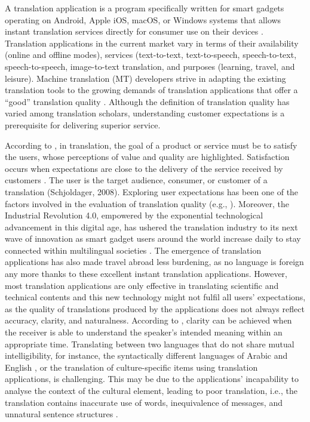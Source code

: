 \documentclass[english]{textolivre}
\begin{document}
A translation application is a program specifically written for smart gadgets operating on Android, Apple iOS, macOS, or Windows systems that allows instant translation services directly for consumer use on their devices \cite{chen_machine_2017}. Translation applications in the current market vary in terms of their availability (online and offline modes), services (text-to-text, text-to-speech, speech-to-text, speech-to-speech, image-to-text translation, and purposes (learning, travel, and leisure). Machine translation (MT) developers strive in adapting the existing translation tools to the growing demands of translation applications that offer a “good” translation quality \cite{way_quality_2018}. Although the definition of translation quality has varied among translation scholars, understanding customer expectations is a prerequisite for delivering superior service.
  
According to \textcite{kurz_conference_2002}, in translation, the goal of a product or service must be to satisfy the users, whose perceptions of value and quality are highlighted. Satisfaction occurs when expectations are close to the delivery of the service received by customers \cite{khristianto_influence_2012}. The user is the target audience, consumer, or customer of a translation (Schjoldager, 2008). Exploring user expectations has been one of the factors involved in the evaluation of translation quality (e.g., \textcite{kurz_conference_1993,tommola_estimating_2003}). Moreover, the Industrial Revolution 4.0, empowered by the exponential technological advancement in this digital age, has ushered the translation industry to its next wave of innovation as smart gadget users around the world increase daily to stay connected within multilingual societies \cite{chen_machine_2017,jimenez_crespo_mobile_2016}. The emergence of translation applications has also made travel abroad less burdening, as no language is foreign any more thanks to these excellent instant translation applications. However, most translation applications are only effective in translating scientific and technical contents and this new technology might not fulfil all users’ expectations, as the quality of translations produced by the applications does not always reflect accuracy, clarity, and naturalness. According to \textcite{chesterman_memes_2000}, clarity can be achieved when the receiver is able to understand the speaker’s intended meaning within an appropriate time. Translating between two languages that do not share mutual intelligibility, for instance, the syntactically different languages of Arabic and English \cite{alqudsi_arabic_2014}, or the translation of culture-specific items using translation applications, is challenging. This may be due to the applications’ incapability to analyse the context of the cultural element, leading to poor translation, i.e., the translation contains inaccurate use of words, inequivalence of messages, and unnatural sentence structures \cite{nababan_teori_2008}.
\end{document}
